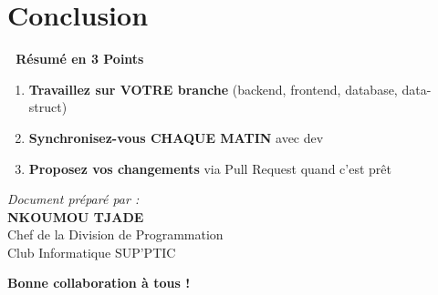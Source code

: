 \documentclass[11pt,a4paper]{article}
\begin{document}
\section*{Conclusion}

\vspace{1cm}

\begin{center}
\Large
\textbf{🎯 Résumé en 3 Points}

\vspace{0.5cm}
\end{center}

\begin{enumerate}
    \item \textbf{Travaillez sur VOTRE branche} (backend, frontend, database, data-struct)
    
    \item \textbf{Synchronisez-vous CHAQUE MATIN} avec dev
    
    \item \textbf{Proposez vos changements} via Pull Request quand c'est prêt
\end{enumerate}

\vspace{1cm}

\begin{center}

\vfill{}

\textit{Document préparé par :} \\
\textbf{NKOUMOU TJADE} \\
Chef de la Division de Programmation \\
Club Informatique SUP'PTIC

\vspace{0.5cm}

\textbf{Bonne collaboration à tous ! 🚀}
\end{center}
\end{document}

